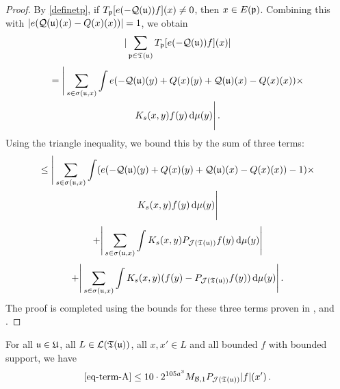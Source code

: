 \begin{proof}
    By \eqref{definetp}, if $T_{{\mathfrak p}}[ e(-{\mathcal{Q}}({\mathfrak u}))f](x) \ne 0$, then $x \in E({\mathfrak p})$. Combining this with $|e({\mathcal{Q}}({\mathfrak u})(x)-{Q}(x)(x))| = 1$, we obtain
    $$
        |\sum_{{\mathfrak p} \in {\mathfrak T}({\mathfrak u})} T_{{\mathfrak p}}[ e(-{\mathcal{Q}}({\mathfrak u}))f](x)|
    $$
    \begin{multline*}
        = \Bigg| \sum_{s \in \sigma({\mathfrak u}, x)} \int e(-{\mathcal{Q}}({\mathfrak u})(y) + {Q}(x)(y) + {\mathcal{Q}}({\mathfrak u})(x) -{Q}(x)(x))\times\\
        K_s(x,y)f(y) \, \mathrm{d}\mu(y) \Bigg|\,.
    \end{multline*}
    Using the triangle inequality, we bound this by the sum of three terms:
    \begin{multline}
        \label{eq-term-A}
        \le \Bigg| \sum_{s \in \sigma({\mathfrak u}, x)} \int (e(-{\mathcal{Q}}({\mathfrak u})(y) + {Q}(x)(y) + {\mathcal{Q}}({\mathfrak u})(x) -{Q}(x)(x))-1)\times\\
        K_s(x,y)f(y) \, \mathrm{d}\mu(y) \Bigg|
    \end{multline}
    \begin{equation}
        \label{eq-term-B}
        + \Bigg| \sum_{s \in \sigma({\mathfrak u}, x)} \int K_s(x,y) P_{\mathcal{J}({\mathfrak T}({\mathfrak u}))} f(y) \, \mathrm{d}\mu(y) \Bigg|
    \end{equation}
    \begin{equation}
        \label{eq-term-C}
        + \Bigg| \sum_{s \in \sigma({\mathfrak u}, x)} \int K_s(x,y) (f(y) - P_{\mathcal{J}({\mathfrak T}({\mathfrak u}))} f(y)) \, \mathrm{d}\mu(y) \Bigg|\,.
    \end{equation}
    The proof is completed using the bounds for these three terms proven in ,  and .
\end{proof}

\begin{lemma}
    \label{first-tree-pointwise}
    \leanok
    For all ${\mathfrak u} \in {\mathfrak U}$, all $L \in \mathcal{L}({\mathfrak T}({\mathfrak u}))$, all $x, x' \in L$ and all bounded $f$ with bounded support, we have
    $$
        \eqref{eq-term-A} \le 10 \cdot 2^{105a^3} M_{\mathcal{B}, 1}P_{\mathcal{J}({\mathfrak T}({\mathfrak u}))}|f|(x')\,.
    $$
\end{lemma}

